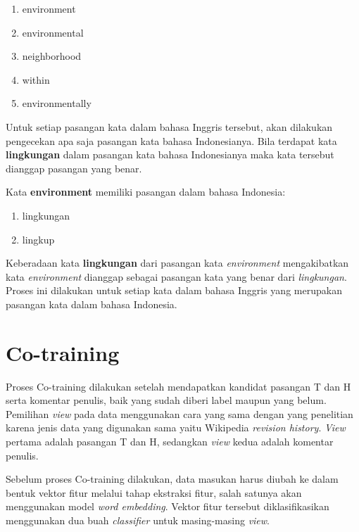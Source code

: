 \begin{enumerate}
	\item environment
	\item environmental
	\item neighborhood
	\item within
	\item environmentally
\end{enumerate}

Untuk setiap pasangan kata dalam bahasa Inggris tersebut, akan dilakukan pengecekan apa saja pasangan kata bahasa Indonesianya. Bila terdapat kata \textbf{lingkungan} dalam pasangan kata bahasa Indonesianya maka kata tersebut dianggap pasangan yang benar.

Kata \textbf{environment} memiliki pasangan dalam bahasa Indonesia:

\begin{enumerate}
	\item lingkungan
	\item lingkup
\end{enumerate}

Keberadaan kata \textbf{lingkungan} dari pasangan kata \textit{environment} mengakibatkan kata \textit{environment} dianggap sebagai pasangan kata yang benar dari \textit{lingkungan}. Proses ini dilakukan untuk setiap kata dalam bahasa Inggris yang merupakan pasangan kata dalam bahasa Indonesia.

\section{Co-training} \label{sec:Co-training}
Proses Co-training dilakukan setelah mendapatkan kandidat pasangan T dan H serta komentar penulis, baik yang sudah diberi label maupun yang belum. Pemilihan \textit{view} pada data menggunakan cara yang sama dengan yang penelitian \cite{zanzottoRTEexpand} karena jenis data yang digunakan sama yaitu Wikipedia \textit{revision history}. \textit{View} pertama adalah pasangan T dan H, sedangkan \textit{view} kedua adalah komentar penulis.

Sebelum proses Co-training dilakukan, data masukan harus diubah ke dalam bentuk vektor fitur melalui tahap ekstraksi fitur, salah satunya akan menggunakan model \textit{word embedding}. Vektor fitur tersebut diklasifikasikan menggunakan dua buah \textit{classifier} untuk masing-masing \textit{view}. 

